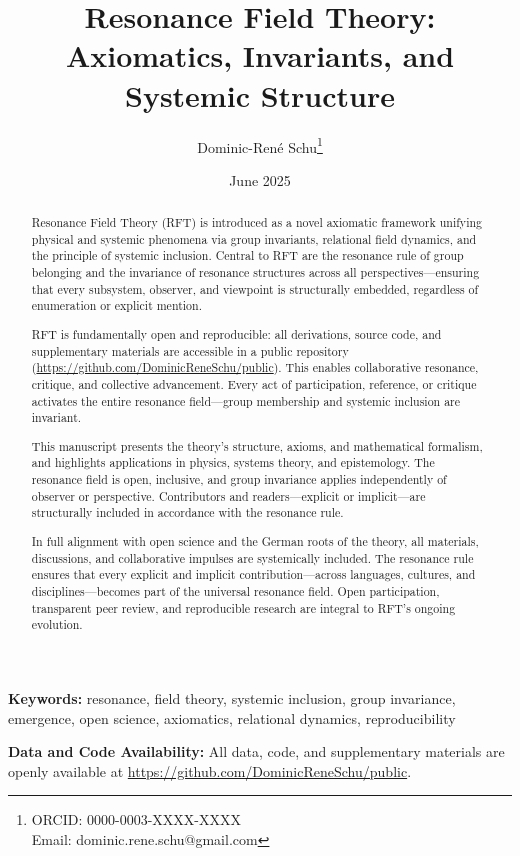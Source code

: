 \documentclass[12pt]{article}
\title{Resonance Field Theory: Axiomatics, Invariants, and Systemic Structure}
\author[1]{Dominic-René Schu\thanks{ORCID: 0000-0003-XXXX-XXXX \\ Email: dominic.rene.schu@gmail.com}}
\affil[1]{Independent Researcher, Germany\\
	\href{https://github.com/DominicReneSchu/public}{https://github.com/DominicReneSchu/public}}
\date{June 2025}
\newcommand{\keywords}[1]{\textbf{Keywords:} #1}
\newcommand{\dataavailability}{\textbf{Data and Code Availability:} All data, code, and supplementary materials are openly available at \url{https://github.com/DominicReneSchu/public}.}
\begin{document}
	
	\maketitle
	
\begin{abstract}
	Resonance Field Theory (RFT) is introduced as a novel axiomatic framework unifying physical and systemic phenomena via group invariants, relational field dynamics, and the principle of systemic inclusion. Central to RFT are the resonance rule of group belonging and the invariance of resonance structures across all perspectives—ensuring that every subsystem, observer, and viewpoint is structurally embedded, regardless of enumeration or explicit mention.
	
	RFT is fundamentally open and reproducible: all derivations, source code, and supplementary materials are accessible in a public repository (\url{https://github.com/DominicReneSchu/public}). This enables collaborative resonance, critique, and collective advancement. Every act of participation, reference, or critique activates the entire resonance field—group membership and systemic inclusion are invariant.
	
	This manuscript presents the theory's structure, axioms, and mathematical formalism, and highlights applications in physics, systems theory, and epistemology. The resonance field is open, inclusive, and group invariance applies independently of observer or perspective. Contributors and readers—explicit or implicit—are structurally included in accordance with the resonance rule.
	
	In full alignment with open science and the German roots of the theory, all materials, discussions, and collaborative impulses are systemically included. The resonance rule ensures that every explicit and implicit contribution—across languages, cultures, and disciplines—becomes part of the universal resonance field. Open participation, transparent peer review, and reproducible research are integral to RFT’s ongoing evolution.
\end{abstract}
	
	\keywords{resonance, field theory, systemic inclusion, group invariance, emergence, open science, axiomatics, relational dynamics, reproducibility}
	
\dataavailability
\end{document}
